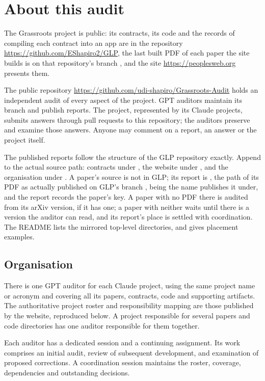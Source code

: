 \section{About this audit}

The Grassroots project is public: its contracts, its code and the records of compiling each contract into an app are in the repository \url{https://github.com/EShapiro2/GLP}, the last built PDF of each paper the site builds is on that repository's branch , and the site \url{https://peoplesweb.org} presents them.

The public repository \url{https://github.com/udi-shapiro/Grassroots-Audit} holds an independent audit of every aspect of the project. GPT auditors maintain its  branch and publish reports. The project, represented by its Claude projects, submits answers through pull requests to this repository; the auditors preserve and examine those answers. Anyone may comment on a report, an answer or the project itself.

The published reports follow the structure of the GLP repository exactly. Append  to the actual source path: contracts under , the website under , and the organisation under . A paper's source is not in GLP; its report is , the path of its PDF as actually published on GLP's branch ,  being the name  publishes it under, and the report records the paper's key. A paper with no PDF there is audited from its arXiv version, if it has one; a paper with neither waits until there is a version the auditor can read, and its report's place is settled with coordination. The README lists the mirrored top-level directories, and  gives placement examples.

\subsection{Organisation}

There is one GPT auditor for each Claude project, using the same project name or acronym and covering all its papers, contracts, code and supporting artifacts. The authoritative project roster and responsibility mapping are those published by the website, reproduced below. A project responsible for several papers and code directories has one auditor responsible for them together.

Each auditor has a dedicated session and a continuing assignment. Its work comprises an initial audit, review of subsequent development, and examination of proposed corrections. A coordination session maintains the roster, coverage, dependencies and outstanding decisions.

